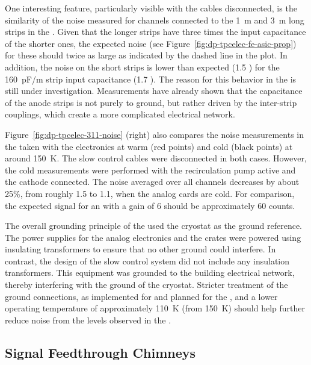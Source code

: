 One interesting feature, particularly visible with the cables disconnected, is the similarity of the noise measured for channels connected to the \SI{1}{\meter} and \SI{3}{\meter} long strips in the . Given that the longer strips have three times the input capacitance of the shorter ones, the expected noise (see Figure~\ref{fig:dp-tpcelec-fe-asic-prop}) for these should twice as large as indicated by the dashed line in the plot. In addition, the noise on the short strips is lower than expected (\num{1.5} ) for the \SI{160}{pF/m} strip input capacitance (\num{1.7} ). The reason for this behavior in the  is still under investigation. Measurements have already shown that the capacitance of the  anode strips is not purely to ground, but rather driven by the inter-strip couplings, which create a more complicated electrical network. 

Figure~\ref{fig:dp-tpcelec-311-noise} (right) also compares the noise measurements in the  taken with the  electronics at warm (red points) and cold (black points) at around \SI{150}{\kelvin}. The slow control cables were disconnected in both cases. However, the cold measurements were performed with the recirculation pump active and the cathode  connected. The  noise averaged over all channels decreases by about 25\%, from roughly \SI{1.5}{} to \SI{1.1}{}, when the  analog cards are cold. For comparison, the expected signal for an  with a  gain of \num{6} should be approximately \SI{60}{} counts. 

The overall grounding principle of the  used the cryostat as the ground reference. The  power supplies for the  analog electronics and the  crates were powered using insulating transformers to ensure that no other ground could interfere. In contrast, the design of the slow control system did not include any insulation transformers. This equipment was grounded to the building electrical network, thereby interfering with the ground of the cryostat. Stricter treatment of the ground connections, as implemented for  and planned for the , and a lower  operating temperature of approximately \SI{110}{\kelvin} (from \SI{150}{\kelvin}) should help further reduce noise from the levels observed in the .


\subsection{Signal Feedthrough Chimneys}
\label{ssec:dp-tpcelec-design-sft}

